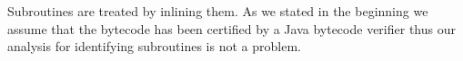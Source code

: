 Subroutines are treated by inlining them. As we stated in the beginning we assume that the bytecode has been certified by a Java
bytecode verifier thus our analysis for identifying  subroutines is not a problem.  


